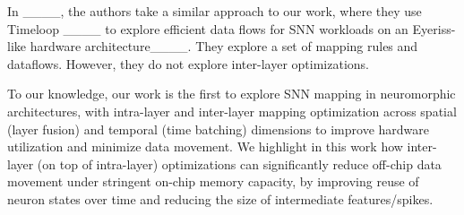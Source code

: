 


In ____, the authors take a similar approach to our work, where they use Timeloop ____ to explore efficient data flows for SNN workloads on an Eyeriss-like hardware architecture____. They explore a set of mapping rules and dataflows. However, they do not explore inter-layer optimizations. 

To our knowledge, our work is the first to explore SNN mapping in neuromorphic architectures, with intra-layer and inter-layer mapping optimization across spatial (layer fusion) and temporal (time batching) dimensions to improve hardware utilization and minimize data movement. We highlight in this work how inter-layer (on top of intra-layer) optimizations can significantly reduce off-chip data movement under stringent on-chip memory capacity, by improving reuse of neuron states over time and reducing the size of intermediate features/spikes.